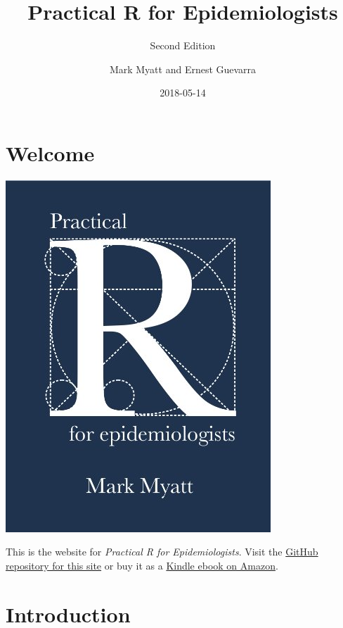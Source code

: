 \documentclass[12pt,a4paper]{book}
\title{Practical R for Epidemiologists}
\subtitle{Second Edition}
\author{Mark Myatt and Ernest Guevarra}
\date{2018-05-14}
\theoremstyle{definition}
\theoremstyle{definition}
\theoremstyle{definition}
\theoremstyle{remark}
\begin{document}
\maketitle

{
\hypersetup{linkcolor=black}
\setcounter{tocdepth}{1}
\tableofcontents
}
\hypertarget{welcome}{%
\chapter*{Welcome}\label{welcome}}

\includegraphics{images/bookcover.jpg}

This is the website for \emph{Practical R for Epidemiologists}. Visit
the
\href{https://github.com/ernestguevarra/practical-r-for-epidemiologists}{GitHub
repository for this site} or buy it as a
\href{https://www.amazon.co.uk/Practical-R-Epidemiologists-Mark-Myatt-ebook/dp/B00DQATKIE/ref=sr_1_1?ie=UTF8\&qid=1524423427\&sr=8-1\&keywords=practical+r+for+epidemiologists}{Kindle
ebook on Amazon}.

\hypertarget{introduction}{%
\chapter*{Introduction}\label{introduction}}
\end{document}
